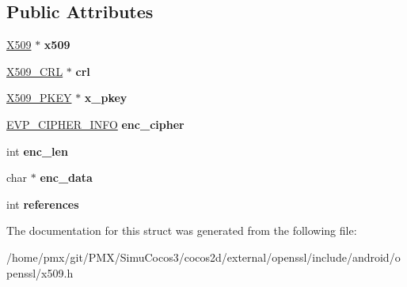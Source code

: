 \subsection*{Public Attributes}
\begin{DoxyCompactItemize}
\item 
\mbox{\label{structX509__info__st_a505b0d6a1b6fc597e1af49ec7afc3f3f}} 
\hyperlink{structx509__st}{X509} $\ast$ {\bfseries x509}
\item 
\mbox{\label{structX509__info__st_aaa75cde4740f8ba04201f32613e3b5d0}} 
\hyperlink{structX509__crl__st}{X509\+\_\+\+C\+RL} $\ast$ {\bfseries crl}
\item 
\mbox{\label{structX509__info__st_a2fe3b4953abbd6bce8991f0255924cb1}} 
\hyperlink{structprivate__key__st}{X509\+\_\+\+P\+K\+EY} $\ast$ {\bfseries x\+\_\+pkey}
\item 
\mbox{\label{structX509__info__st_a157d206dc1a125ab2b4c7d166a7de138}} 
\hyperlink{structevp__cipher__info__st}{E\+V\+P\+\_\+\+C\+I\+P\+H\+E\+R\+\_\+\+I\+N\+FO} {\bfseries enc\+\_\+cipher}
\item 
\mbox{\label{structX509__info__st_a8da5cd22fabb3c72738fabac57bbe64f}} 
int {\bfseries enc\+\_\+len}
\item 
\mbox{\label{structX509__info__st_a9d837b002c6e82c70620fbaa0f2dcb03}} 
char $\ast$ {\bfseries enc\+\_\+data}
\item 
\mbox{\label{structX509__info__st_ab5653bf99a3d84cffed5ec7c52da92e3}} 
int {\bfseries references}
\end{DoxyCompactItemize}


The documentation for this struct was generated from the following file\+:\begin{DoxyCompactItemize}
\item 
/home/pmx/git/\+P\+M\+X/\+Simu\+Cocos3/cocos2d/external/openssl/include/android/openssl/x509.\+h\end{DoxyCompactItemize}

